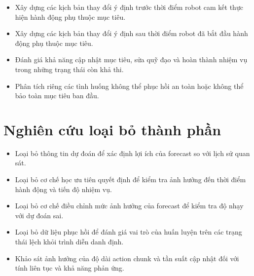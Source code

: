 \begin{itemize}
    \item Xây dựng các kịch bản thay đổi ý định trước thời điểm robot cam kết thực hiện hành động phụ thuộc mục tiêu.

    \item Xây dựng các kịch bản thay đổi ý định sau thời điểm robot đã bắt đầu hành động phụ thuộc mục tiêu.

    \item Đánh giá khả năng cập nhật mục tiêu, sửa quỹ đạo và hoàn thành nhiệm vụ trong những trạng thái còn khả thi.

    \item Phân tích riêng các tình huống không thể phục hồi an toàn hoặc không thể bảo toàn mục tiêu ban đầu.
\end{itemize}


\section{Nghiên cứu loại bỏ thành phần}

\begin{itemize}
    \item Loại bỏ thông tin dự đoán để xác định lợi ích của forecast so với lịch sử quan sát.

    \item Loại bỏ cơ chế học ưu tiên quyết định để kiểm tra ảnh hưởng đến thời điểm hành động và tiến độ nhiệm vụ.

    \item Loại bỏ cơ chế điều chỉnh mức ảnh hưởng của forecast để kiểm tra độ nhạy với dự đoán sai.

    \item Loại bỏ dữ liệu phục hồi để đánh giá vai trò của huấn luyện trên các trạng thái lệch khỏi trình diễn danh định.

    \item Khảo sát ảnh hưởng của độ dài action chunk và tần suất cập nhật đối với tính liên tục và khả năng phản ứng.
\end{itemize}



